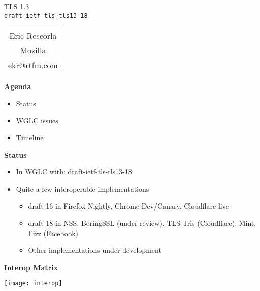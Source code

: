 \documentclass[helvetica]{seminar}
\newcommand{\heading}[1]{%
  \begin{center} 
    \large\bf 
    #1 
  \end{center} 
  \vspace{.4 in}}
\begin{document}
\begin{slide}
\begin{center}
\vspace{.5 in}
\LARGE{{\bf}TLS 1.3\\{\small \verb^draft-ietf-tls-tls13-18^}}\\
\vspace{.2in}
\large{
\begin{tabular}{c}
Eric Rescorla\\
Mozilla\\
\url{ekr@rtfm.com}
\end{tabular}
}
\end{center}
\end{slide}

\centerslidesfalse 

\begin{slide}
\heading{Agenda}

\begin{itemize}
\item Status
\item WGLC issues
\item Timeline
\end{itemize}

\end{slide}


\begin{slide}
\heading{Status}

\begin{itemize}
\item In WGLC with: draft-ietf-tls-tls13-18
\item Quite a few interoperable implementations
  \begin{itemize}
  \item draft-16 in Firefox Nightly, Chrome Dev/Canary, Cloudflare live
  \item draft-18 in NSS, BoringSSL (under review), TLS-Tris (Cloudflare), Mint, Fizz (Facebook)
  \item Other implementations under development
  \end{itemize}
\end{itemize}
\end{slide}

\begin{slide}
\heading{Interop Matrix}

\texttt{[image: interop]}
\end{slide}
\end{document}
